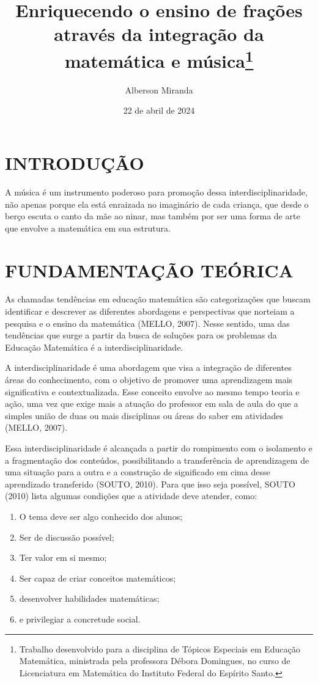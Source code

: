 \documentclass[
  letterpaper,
  DIV=11,
  numbers=noendperiod]{scrreprt}
\title{Enriquecendo o ensino de frações através da integração da
matemática e música\thanks{Trabalho desenvolvido para a disciplina de
Tópicos Especiais em Educação Matemática, ministrada pela professora
Débora Domingues, no curso de Licenciatura em Matemática do Instituto
Federal do Espírito Santo.}}
\author{Alberson Miranda}
\date{22 de abril de 2024}
\providecommand{\tightlist}{%
  \setlength{\itemsep}{0pt}\setlength{\parskip}{0pt}}\usepackage{longtable,booktabs,array}
\renewcommand*\contentsname{Índice}
\newcommand\contentsname{Índice}
\begin{document}
\maketitle

\renewcommand*\contentsname{Índice}
{
\hypersetup{linkcolor=}
\setcounter{tocdepth}{2}
\tableofcontents
}
\chapter{INTRODUÇÃO}\label{introduuxe7uxe3o}

A música é um instrumento poderoso para promoção dessa
interdisciplinaridade, não apenas porque ela está enraizada no
imaginário de cada criança, que desde o berço escuta o canto da mãe ao
ninar, mas também por ser uma forma de arte que envolve a matemática em
sua estrutura.

\chapter{FUNDAMENTAÇÃO TEÓRICA}\label{fundamentauxe7uxe3o-teuxf3rica}

As chamadas tendências em educação matemática são categorizações que
buscam identificar e descrever as diferentes abordagens e perspectivas
que norteiam a pesquisa e o ensino da matemática (MELLO, 2007). Nesse
sentido, uma das tendências que surge a partir da busca de soluções para
os problemas da Educação Matemática é a interdisciplinaridade.

A interdisciplinaridade é uma abordagem que visa a integração de
diferentes áreas do conhecimento, com o objetivo de promover uma
aprendizagem mais significativa e contextualizada. Esse conceito envolve
ao mesmo tempo teoria e ação, uma vez que exige mais a atuação do
professor em sala de aula do que a simples união de duas ou mais
disciplinas ou áreas do saber em atividades (MELLO, 2007).

Essa interdisciplinaridade é alcançada a partir do rompimento com o
isolamento e a fragmentação dos conteúdos, possibilitando a
transferência de aprendizagem de uma situação para a outra e a
construção de significado em cima desse aprendizado transferido (SOUTO,
2010). Para que isso seja possível, SOUTO (2010) lista algumas condições
que a atividade deve atender, como:

\begin{enumerate}
\def\labelenumi{\arabic{enumi}.}
\tightlist
\item
  O tema deve ser algo conhecido dos alunos;
\item
  Ser de discussão possível;
\item
  Ter valor em si mesmo;
\item
  Ser capaz de criar conceitos matemáticos;
\item
  desenvolver habilidades matemáticas;
\item
  e privilegiar a concretude social.
\end{enumerate}
\end{document}
